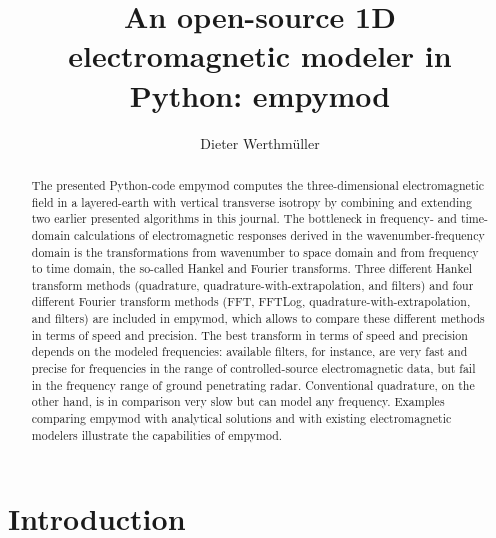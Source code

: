 \documentclass[manuscript,revised]{geophysics}
\begin{document}
\title{An open-source 1D electromagnetic modeler in Python: empymod}

\renewcommand{\thefootnote}{1}%


\address{Instituto Mexicano del Petróleo,
         Eje Central Lázaro Cárdenas Norte 152,
         Col. San Bartolo Atepehuacan C.P. 07730,
         Ciudad de México, México.
         E-mail: \href{mailto:dieter@werthmuller.org}{Dieter@Werthmuller.org}.}

\author{Dieter Werthmüller\footnotemark[1]}

\footer{}

\maketitle

\begin{abstract} %
  The presented Python-code empymod computes the three-dimensional
  electromagnetic field in a layered-earth with vertical transverse isotropy by
  combining and extending two earlier presented algorithms in this journal.
  The bottleneck in frequency- and time-domain calculations of electromagnetic
  responses derived in the wavenumber-frequency domain is the transformations
  from wavenumber to space domain and from frequency to time domain, the
  so-called Hankel and Fourier transforms. Three different Hankel transform
  methods (quadrature, quadrature-with-extrapolation, and filters) and four
  different Fourier transform methods (FFT, FFTLog,
  quadrature-with-extrapolation, and filters) are included in empymod, which
  allows to compare these different methods in terms of speed and precision.
  The best transform in terms of speed and precision depends on the modeled
  frequencies: available filters, for instance, are very fast and precise for
  frequencies in the range of controlled-source electromagnetic data, but fail
  in the frequency range of ground penetrating radar. Conventional quadrature,
  on the other hand, is in comparison very slow but can model any frequency.
  Examples comparing empymod with analytical solutions and with existing
  electromagnetic modelers illustrate the capabilities of empymod.
\end{abstract}

\section{Introduction}
\end{document}
